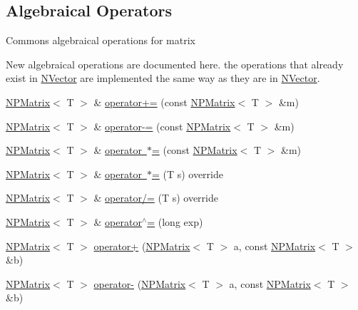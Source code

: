 \subsection*{Algebraical Operators}
\label{_amgrp3551c228ed792030edc3367553a30343}%
Commons algebraical operations for matrix

New algebraical operations are documented here. the operations that already exist in {\ttfamily \mbox{\hyperlink{class_n_vector}{N\+Vector}}} are implemented the same way as they are in {\ttfamily \mbox{\hyperlink{class_n_vector}{N\+Vector}}}. \begin{DoxyCompactItemize}
\item 
\mbox{\hyperlink{class_n_p_matrix}{N\+P\+Matrix}}$<$ T $>$ \& \mbox{\hyperlink{class_n_p_matrix_a80155cd4a89df4bffcce2e67dad5d163}{operator+=}} (const \mbox{\hyperlink{class_n_p_matrix}{N\+P\+Matrix}}$<$ T $>$ \&m)
\item 
\mbox{\hyperlink{class_n_p_matrix}{N\+P\+Matrix}}$<$ T $>$ \& \mbox{\hyperlink{class_n_p_matrix_af69b2b25137954658c5941e733aebfb5}{operator-\/=}} (const \mbox{\hyperlink{class_n_p_matrix}{N\+P\+Matrix}}$<$ T $>$ \&m)
\item 
\mbox{\hyperlink{class_n_p_matrix}{N\+P\+Matrix}}$<$ T $>$ \& \mbox{\hyperlink{class_n_p_matrix_a72e1b54eb9a6dc5b7a42047985d86e13}{operator $\ast$=}} (const \mbox{\hyperlink{class_n_p_matrix}{N\+P\+Matrix}}$<$ T $>$ \&m)
\item 
\mbox{\hyperlink{class_n_p_matrix}{N\+P\+Matrix}}$<$ T $>$ \& \mbox{\hyperlink{class_n_p_matrix_a7e0436ab2932534fe9f0a15db4a5560e}{operator $\ast$=}} (T s) override
\item 
\mbox{\hyperlink{class_n_p_matrix}{N\+P\+Matrix}}$<$ T $>$ \& \mbox{\hyperlink{class_n_p_matrix_a0150ab8322e2ea4a2550531dda3dfabd}{operator/=}} (T s) override
\item 
\mbox{\hyperlink{class_n_p_matrix}{N\+P\+Matrix}}$<$ T $>$ \& \mbox{\hyperlink{class_n_p_matrix_abfcd24ec4d59beeefc5574a299641605}{operator$^\wedge$=}} (long exp)
\item 
\mbox{\hyperlink{class_n_p_matrix}{N\+P\+Matrix}}$<$ T $>$ \mbox{\hyperlink{class_n_p_matrix_aa3388754bcd5226d11ca97c258864300}{operator+}} (\mbox{\hyperlink{class_n_p_matrix}{N\+P\+Matrix}}$<$ T $>$ a, const \mbox{\hyperlink{class_n_p_matrix}{N\+P\+Matrix}}$<$ T $>$ \&b)
\item 
\mbox{\hyperlink{class_n_p_matrix}{N\+P\+Matrix}}$<$ T $>$ \mbox{\hyperlink{class_n_p_matrix_aeaf32670ee97547e19c84b9980f35914}{operator-\/}} (\mbox{\hyperlink{class_n_p_matrix}{N\+P\+Matrix}}$<$ T $>$ a, const \mbox{\hyperlink{class_n_p_matrix}{N\+P\+Matrix}}$<$ T $>$ \&b)

\end{DoxyCompactItemize}
